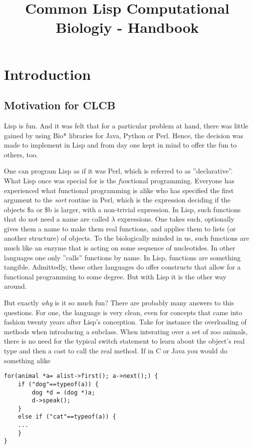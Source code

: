 \documentclass{book}
\title{Common Lisp Computational Biologiy - Handbook}
\newcommand\CLCB{CLCB }
\begin{document}
\titlepage
\tableofcontents

\chapter{Introduction}


\section{Motivation for \CLCB}

Lisp is fun. And it was felt that for a particular problem at hand, 
there was little gained by using Bio* libraries for Java, Python or Perl.
Hence, the decision was made to implement in Lisp and from day one kept in
mind to offer the fun to others, too.

One can program Lisp as if it was Perl, which is referred to as
''declarative''. What Lisp once was special for is the {\em fun}ctional
programming. Everyone has experienced what functional programming is alike
who has specified the first argument to the {\em sort} routine in Perl,
which is the expression deciding if the objects \$a or \$b is larger, with
a non-trivial expression.  In Lisp,
such functions that do not need a name are called $\lambda$ expressions.
One takes such, optionally gives them a name to make them real functions,
and applies them to lists (or another structure) of objects. To the
biologically minded in us, such functions are much like an enzyme
that is acting on some sequence of nucleotides. In other languages
one only ''calls'' functions by name. In Lisp, functions are something
tangible. Admittedly, these other languages do offer constructs that
allow for a functional programming to some degree. But with Lisp it is
the other way around.

But exactly {\em why} is it so much fun? There are probably many answers
to this questions.  For one, the language is very clean, even for concepts
that came into fashion twenty years after Lisp's conception. Take
for instance the overloading of methods when introducing a subclass.
When interating over a set of zoo animals, there is no need for the
typical switch statement to learn about the object's real type and then a
cast to call the real method. If in C or Java you would do something alike

\lstset{language=C}
\begin{lstlisting}
for(animal *a= alist->first(); a->next();) {
	if ("dog"==typeof(a)) {
		dog *d = (dog *)a;
		d->speak();
	}
	else if ("cat"==typeof(a)) {
	...
	}
}
\end{lstlisting}
\end{document}
